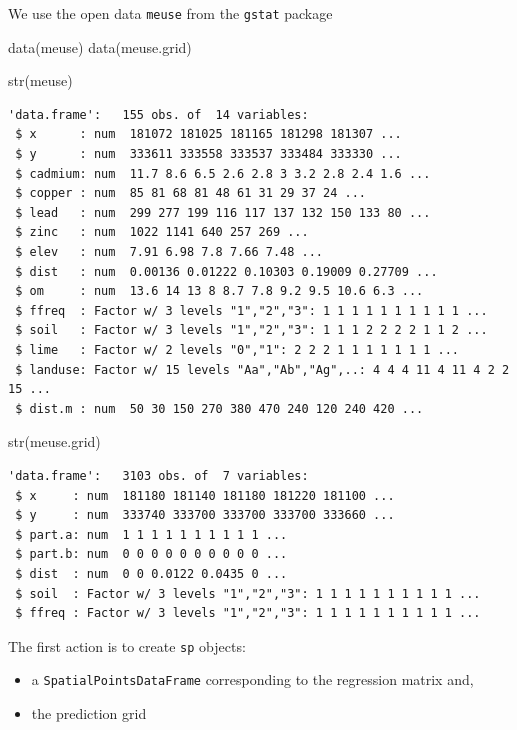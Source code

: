 \documentclass[
  a4paper,
]{article}
\newenvironment{Shaded}{\begin{snugshade}}{\end{snugshade}}
\newcommand{\FunctionTok}[1]{\textcolor[rgb]{0.28,0.35,0.67}{#1}}
\newcommand{\NormalTok}[1]{\textcolor[rgb]{0.00,0.23,0.31}{#1}}
\begin{document}
We use the open data \texttt{meuse} from the \texttt{gstat} package

\begin{Shaded}
\begin{Highlighting}[]
\FunctionTok{data}\NormalTok{(meuse)}
\FunctionTok{data}\NormalTok{(meuse.grid)}

\FunctionTok{str}\NormalTok{(meuse)}
\end{Highlighting}
\end{Shaded}

\begin{verbatim}
'data.frame':   155 obs. of  14 variables:
 $ x      : num  181072 181025 181165 181298 181307 ...
 $ y      : num  333611 333558 333537 333484 333330 ...
 $ cadmium: num  11.7 8.6 6.5 2.6 2.8 3 3.2 2.8 2.4 1.6 ...
 $ copper : num  85 81 68 81 48 61 31 29 37 24 ...
 $ lead   : num  299 277 199 116 117 137 132 150 133 80 ...
 $ zinc   : num  1022 1141 640 257 269 ...
 $ elev   : num  7.91 6.98 7.8 7.66 7.48 ...
 $ dist   : num  0.00136 0.01222 0.10303 0.19009 0.27709 ...
 $ om     : num  13.6 14 13 8 8.7 7.8 9.2 9.5 10.6 6.3 ...
 $ ffreq  : Factor w/ 3 levels "1","2","3": 1 1 1 1 1 1 1 1 1 1 ...
 $ soil   : Factor w/ 3 levels "1","2","3": 1 1 1 2 2 2 2 1 1 2 ...
 $ lime   : Factor w/ 2 levels "0","1": 2 2 2 1 1 1 1 1 1 1 ...
 $ landuse: Factor w/ 15 levels "Aa","Ab","Ag",..: 4 4 4 11 4 11 4 2 2 15 ...
 $ dist.m : num  50 30 150 270 380 470 240 120 240 420 ...
\end{verbatim}

\begin{Shaded}
\begin{Highlighting}[]
\FunctionTok{str}\NormalTok{(meuse.grid)}
\end{Highlighting}
\end{Shaded}

\begin{verbatim}
'data.frame':   3103 obs. of  7 variables:
 $ x     : num  181180 181140 181180 181220 181100 ...
 $ y     : num  333740 333700 333700 333700 333660 ...
 $ part.a: num  1 1 1 1 1 1 1 1 1 1 ...
 $ part.b: num  0 0 0 0 0 0 0 0 0 0 ...
 $ dist  : num  0 0 0.0122 0.0435 0 ...
 $ soil  : Factor w/ 3 levels "1","2","3": 1 1 1 1 1 1 1 1 1 1 ...
 $ ffreq : Factor w/ 3 levels "1","2","3": 1 1 1 1 1 1 1 1 1 1 ...
\end{verbatim}

The first action is to create \texttt{sp} objects:

\begin{itemize}
\item
  a \texttt{SpatialPointsDataFrame} corresponding to the regression
  matrix and,
\item
  the prediction grid
\end{itemize}
\end{document}
